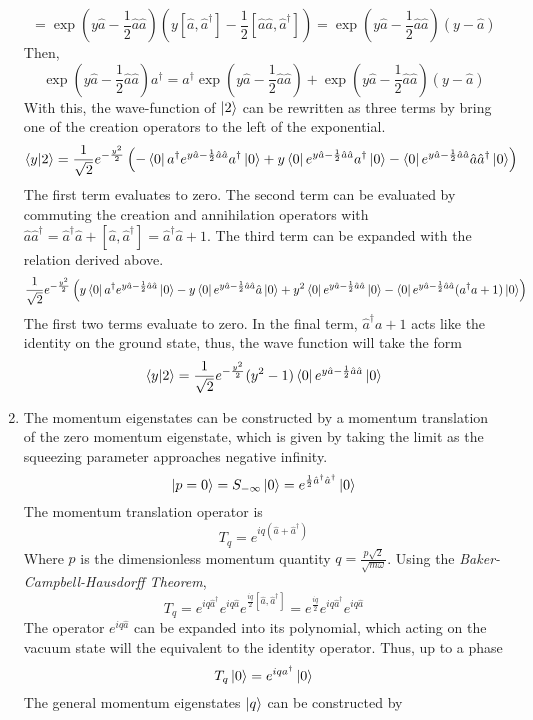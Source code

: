 \begin{sol}
\begin{enumerate}[label=\textbf{(\alph*)}]
    $$=\exp\left(y\hat a-\frac{1}{2}\hat a\hat a\right)\left(y[\hat a, \hat a^\dagger]-\frac{1}{2}[\hat a\hat a,\hat a^\dagger] \right)=\exp\left(y\hat a-\frac{1}{2}\hat a\hat a\right)(y-\hat a)$$ 
Then,
$$\exp\left(y\hat a-\frac{1}{2}\hat a\hat a\right)a^\dagger=a^\dagger\exp\left(y\hat a-\frac{1}{2}\hat a\hat a\right)+\exp\left(y\hat a-\frac{1}{2}\hat a\hat a\right)(y-\hat a)$$
    With this, the wave-function of $\ket 2$ can be rewritten as three terms by bring one of the creation operators to the left of the exponential.
    $$\braket{y}{2}=\frac{1}{\sqrt{2}}e^{-\frac{y^2}{2}}\left(-\bra 0a^\dagger e^{y\hat a-\frac{1}{2}\hat a\hat a}a^\dagger\ket 0+y\bra 0e^{y\hat a-\frac{1}{2}\hat a\hat a}a^\dagger\ket 0-\bra 0e^{y\hat a-\frac{1}{2}\hat a\hat a}\hat a\hat a^\dagger\ket 0\right)$$ 
    The first term evaluates to zero. The second term can be evaluated by commuting the creation and annihilation operators with $\hat a\hat a^\dagger = \hat a^\dagger \hat a+[\hat a, \hat a^\dagger]=\hat a^\dagger \hat a+1$. The third term can be expanded with the relation derived above.
    $$\frac{1}{\sqrt 2}e^{-\frac{y^2}{2}}\left(y\bra 0a^\dagger e^{y\hat a-\frac{1}{2}\hat a\hat a}\ket 0-y\bra 0e^{y\hat a-\frac{1}{2}\hat a\hat a}\hat a\ket0+y^2\bra 0e^{y\hat a-\frac{1}{2}\hat a\hat a}\ket0-\bra 0e^{y\hat a-\frac{1}{2}\hat a\hat a}(a^\dagger a+1)\ket 0\right)$$
    The first two terms evaluate to zero. In the final term, $\hat a^\dagger a+1$ acts like the identity on the ground state, thus, the wave function will take the form
    $$\braket{y}{2}=\frac{1}{\sqrt 2}e^{-\frac{y^2}{2}}(y^2-1)\bra 0e^{y\hat a-\frac{1}{2}\hat a\hat a}\ket 0$$
    \item
    The momentum eigenstates can be constructed by a momentum translation of the zero momentum eigenstate, which is given by taking the limit as the squeezing parameter approaches negative infinity. 
    $$\ket{p=0}=S_{-\infty}\ket 0=e^{\frac{1}{2}\hat a^\dagger\hat a^\dagger}\ket 0$$
    The momentum translation operator is
    $$T_q = e^{iq(\hat a+\hat a^\dagger)}$$
    Where $p$ is the dimensionless momentum quantity $q=\frac{p\sqrt{2}}{\sqrt{m\omega}}$. Using the \textit{Baker-Campbell-Hausdorff Theorem}, 
    $$T_q = e^{iq\hat a^\dagger}e^{iq\hat a}e^{\frac{iq}{2}[\hat a,\hat a^\dagger]}=e^{\frac{iq}{2}}e^{iq\hat a^\dagger}e^{iq\hat a}$$
    The operator $e^{iq\hat a}$ can be expanded into its polynomial, which acting on the vacuum state will the equivalent to the identity operator. Thus, up to a phase
    $$T_q\ket 0 = e^{iqa^\dagger}\ket 0$$
    The general momentum eigenstates $\ket q$ can be constructed by

\end{enumerate}
\end{sol}
